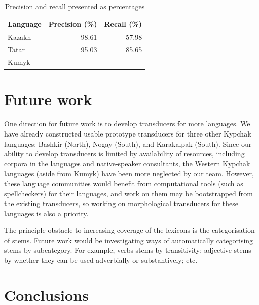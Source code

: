 \documentclass[a4paper,11pt,twocolumn]{article}
\begin{document}


\begin{table}
\begin{center}
	\begin{tabular}{lrr}
	\toprule
		\textbf{Language} & \textbf{Precision (\%)} & \textbf{Recall (\%)} \\
	\midrule
		Kazakh & 98.61 &  57.98 \\
		Tatar & 95.03 & 85.65 \\
		Kumyk & - & - \\
	\bottomrule
	\end{tabular}
	\caption{Precision and recall presented as percentages}
	\label{table:precrecall}
\end{center}
\end{table}


\section{Future work}


One direction for future work is to develop transducers for more languages.  We have already constructed usable prototype transducers for three other Kypchak languages: Bashkir (North), Nogay (South), and Karakalpak (South).  Since our ability to develop transducers is limited by availability of resources, including corpora in the languages and native-speaker consultants, the Western Kypchak languages (aside from Kumyk) have been more neglected by our team.  However, these language communities would benefit from computational tools (such as spellcheckers) for their languages, and work on them may be bootstrapped from the existing transducers, so working on morphological transducers for these languages is also a priority.

The principle obstacle to increasing coverage of the lexicons is the categorisation of stems. Future work would be investigating ways of automatically categorising stems by subcategory. For example, verbs stems by transitivity; adjective stems by whether  they can be used adverbially or substantively; etc. 

\section{Conclusions}\label{sec:conclusions}
\end{document}
